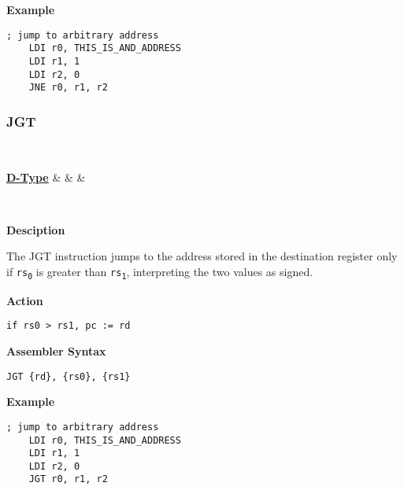 \vspace{3ex}

\textbf{Example}
\begin{lstlisting}[frame=single]
	; jump to arbitrary address
	LDI r0, THIS_IS_AND_ADDRESS
	LDI r1, 1
	LDI r2, 0
	JNE r0, r1, r2
\end{lstlisting}

\subsubsection{JGT }\label{sec:JGT}

\vspace{3ex}

\begin{center}
	\begin{bytefield}[leftcurly=., leftcurlyspace=0pt]{32}
		 \\
		\begin{leftwordgroup}{\hyperref[sec:r-type]{\textbf{D-Type}}}
		 & 
		 &
		 &
		\end{leftwordgroup}\\
	\end{bytefield}
\end{center}

\textbf{Desciption}

The JGT instruction jumps to the address stored in the destination register only if \texttt{rs\textsubscript{0}} is greater than \texttt{rs\textsubscript{1}},
interpreting the two values as signed.

\vspace{3ex}

\textbf{Action}
\begin{lstlisting}[frame=single]
	if rs0 > rs1, pc := rd
\end{lstlisting}

\vspace{3ex}

\textbf{Assembler Syntax}
\begin{lstlisting}[frame=single]
	JGT {rd}, {rs0}, {rs1}
\end{lstlisting}

\vspace{3ex}

\textbf{Example}
\begin{lstlisting}[frame=single]
	; jump to arbitrary address
	LDI r0, THIS_IS_AND_ADDRESS
	LDI r1, 1
	LDI r2, 0
	JGT r0, r1, r2
\end{lstlisting}

